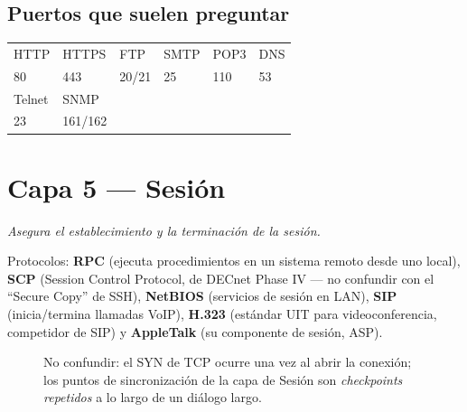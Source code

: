 \documentclass[11pt,a4paper]{article}
\begin{document}
\subsection*{Puertos que suelen preguntar}
\begin{center}
\small
\begin{tabular}{@{}llllll@{}}
\toprule
HTTP & HTTPS & FTP & SMTP & POP3 & DNS \\
80 & 443 & 20/21 & 25 & 110 & 53 \\
\midrule
Telnet & SNMP & & & & \\
23 & 161/162 & & & & \\
\bottomrule
\end{tabular}
\end{center}

\newpage
\section{Capa 5 --- Sesión}
\textit{Asegura el establecimiento y la terminación de la sesión.}

Protocolos: \textbf{RPC} (ejecuta procedimientos en un sistema remoto desde uno local), \textbf{SCP} (Session Control Protocol, de DECnet Phase IV --- no confundir con el ``Secure Copy'' de SSH), \textbf{NetBIOS} (servicios de sesión en LAN), \textbf{SIP} (inicia/termina llamadas VoIP), \textbf{H.323} (estándar UIT para videoconferencia, competidor de SIP) y \textbf{AppleTalk} (su componente de sesión, ASP).

\begin{figure}[h]
\centering
{}
\caption{No confundir: el SYN de TCP ocurre una vez al abrir la conexión; los puntos de sincronización de la capa de Sesión son \emph{checkpoints repetidos} a lo largo de un diálogo largo.}
\end{figure}
\end{document}
